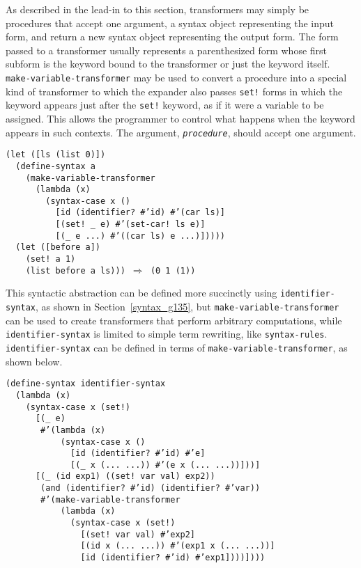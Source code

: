 As described in the lead-in to this section, transformers may simply be
procedures that accept one argument,
a syntax object representing the input form, and return a new syntax object
representing the output form.
The form passed to a transformer usually represents a parenthesized form whose
first subform is the keyword bound to the transformer or just the keyword
itself.
\texttt{make-variable-transformer} may be used to convert a procedure into
a special kind of transformer to which the expander also passes \texttt{set!}
forms in which the keyword appears just after the \texttt{set!} keyword, as
if it were a variable to be assigned.
This allows the programmer to control what happens when the keyword appears
in such contexts.
The argument, \texttt{\textit{procedure}}, should accept one argument.


\begin{alltt}
(let ([ls (list 0)])
  (define-syntax a
    (make-variable-transformer
      (lambda (x)
        (syntax-case x ()
          [id (identifier? \#{}'id) \#{}'(car ls)]
          [(set! \_{} e) \#{}'(set-car! ls e)]
          [(\_{} e ...) \#{}'((car ls) e ...)]))))
  (let ([before a])
    (set! a 1)
    (list before a ls))) \(\Rightarrow\) (0 1 (1))
\end{alltt}


\label{syntax_s43}This syntactic abstraction can be defined more succinctly using
\texttt{identifier-syntax}, as shown in Section \ref{syntax_g135},
but \texttt{make-variable-transformer} can be used to create
transformers that perform arbitrary computations, while
\texttt{identifier-syntax} is limited to simple term rewriting,
like \texttt{syntax-rules}.
\texttt{identifier-syntax} can be defined
in terms of \texttt{make-variable-transformer}, as shown below.


\begin{alltt}
(define-syntax identifier-syntax\label{syntax_defn_identifier_syntax}
  (lambda (x)
    (syntax-case x (set!)
      [(\_{} e)
       \#{}'(lambda (x)
           (syntax-case x ()
             [id (identifier? \#{}'id) \#{}'e]
             [(\_{} x (... ...)) \#{}'(e x (... ...))]))]
      [(\_{} (id exp1) ((set! var val) exp2))
       (and (identifier? \#{}'id) (identifier? \#{}'var))
       \#{}'(make-variable-transformer
           (lambda (x)
             (syntax-case x (set!)
               [(set! var val) \#{}'exp2]
               [(id x (... ...)) \#{}'(exp1 x (... ...))]
               [id (identifier? \#{}'id) \#{}'exp1])))])))
\end{alltt}

